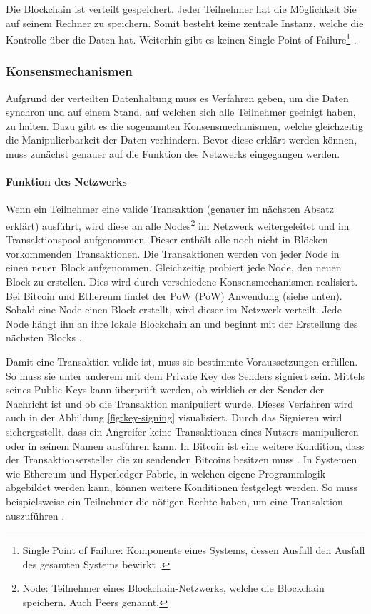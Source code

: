 Die Blockchain ist verteilt gespeichert. Jeder Teilnehmer hat die Möglichkeit Sie auf seinem Rechner zu speichern. Somit besteht keine zentrale Instanz, welche die Kontrolle über die Daten hat. Weiterhin gibt es keinen Single Point of Failure\footnote{Single Point of Failure: Komponente eines Systems, dessen Ausfall den Ausfall des gesamten Systems bewirkt \cite{KshetriCanBlockchainStrengthen2017}.} \cite{KshetriCanBlockchainStrengthen2017}.

\label{subsec:konsens}
\subsubsection{Konsensmechanismen}
Aufgrund der verteilten Datenhaltung muss es Verfahren geben, um die Daten synchron und auf einem Stand, auf welchen sich alle Teilnehmer geeinigt haben, zu halten. Dazu gibt es die sogenannten Konsensmechanismen, welche gleichzeitig die Manipulierbarkeit der Daten verhindern. Bevor diese erklärt werden können, muss zunächst genauer auf die Funktion des Netzwerks eingegangen werden.

\paragraph{Funktion des Netzwerks}
Wenn ein Teilnehmer eine valide Transaktion (genauer im nächsten Absatz erklärt) ausführt, wird diese an alle Nodes\footnote{Node: Teilnehmer eines Blockchain-Netzwerks, welche die Blockchain speichern. Auch Peers genannt.} im Netzwerk weitergeleitet und im Transaktionspool aufgenommen. Dieser enthält alle noch nicht in Blöcken vorkommenden Transaktionen. Die Transaktionen werden von jeder Node in einen neuen Block aufgenommen. Gleichzeitig probiert jede Node, den neuen Block zu erstellen. Dies wird durch verschiedene Konsensmechanismen realisiert. Bei Bitcoin und Ethereum findet der \acl{PoW} (\acs{PoW}) Anwendung (siehe unten). Sobald eine Node einen Block erstellt, wird dieser im Netzwerk verteilt. Jede Node hängt ihn an ihre lokale Blockchain an und beginnt mit der Erstellung des nächsten Blocks \cite[S.~200 ff.]{AntonopoulosMasteringbitcoin2015}.

Damit eine Transaktion valide ist, muss sie bestimmte Voraussetzungen erfüllen. So muss sie unter anderem mit dem Private Key des Senders signiert sein. Mittels seines Public Keys kann überprüft werden, ob wirklich er der Sender der Nachricht ist und ob die Transaktion manipuliert wurde. Dieses Verfahren wird auch in der Abbildung \ref{fig:key-signing} visualisiert. Durch das Signieren wird sichergestellt, dass ein Angreifer keine Transaktionen eines Nutzers manipulieren oder in seinem Namen ausführen kann. In Bitcoin ist eine weitere Kondition, dass der Transaktionsersteller die zu sendenden Bitcoins besitzen muss \cite[S.~18]{AntonopoulosMasteringbitcoin2015}. In Systemen wie Ethereum und Hyperledger Fabric, in welchen eigene Programmlogik abgebildet werden kann, können weitere Konditionen festgelegt werden. So muss beispielsweise ein Teilnehmer die nötigen Rechte haben, um eine Transaktion auszuführen \cite{HyperledgerComposerTeamAccessControlLanguage}.

